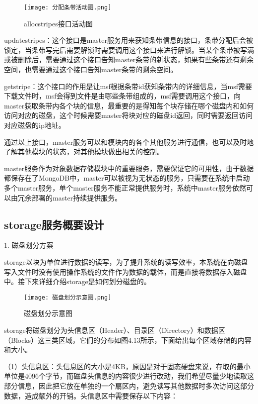 \begin{figure}
  \centering
  \texttt{[image: 分配条带活动图.png]}
  \caption{allocstripes接口活动图}
\end{figure}

updatestripes：这个接口是master服务用来获知条带信息的接口，条带分配后会被锁定，当条带写完后需要解锁时需要调用这个接口来进行解锁。当某个条带被写满或被删除后，需要通过这个接口告知master条带的新状态，如果有些条带还有剩余空间，也需要通过这个接口告知master条带的剩余空间。

getstripe：这个接口的作用是让msf根据条带id获知条带内的详细信息，当msf需要下载文件时，msf会得到文件是由哪些条带组成的，msf需要调用这个接口，向master获取条带内各个块的信息，最重要的是得知每个块存储在哪个磁盘内和如何访问对应的磁盘，这个时候需要master将块对应的磁盘id返回，同时需要返回访问对应磁盘的ip地址。

通过以上接口，master服务可以和模块内的各个其他服务进行通信，也可以及时地了解其他模块的状态，对其他模块做出相关的控制。

master服务作为对象数据存储模块中的重要服务，需要保证它的可用性，由于数据都保存在了MongoDB中，master可以被视为无状态的服务，只需要在系统中启动多个master服务，单个master服务不能正常提供服务时，系统中master服务依然可以由冗余部署的master持续提供服务。

\subsection{storage服务概要设计}

1. 磁盘划分方案

storage以块为单位进行数据的读写，为了提升系统的读写效率，本系统在向磁盘写入文件时没有使用操作系统的文件作为数据的载体，而是直接将数据存入磁盘中。接下来详细介绍storage是如何划分磁盘的。

\begin{figure}
  \centering
  \texttt{[image: 磁盘划分示意图.png]}
  \caption{磁盘划分示意图}
\end{figure}

storage将磁盘划分为头信息区（Header）、目录区（Directory）和数据区（Blocks）这三类区域，它们的分布如图4.13所示，下面给出每个区域存储的内容和大小。

（1）头信息区：头信息区的大小是4KB，原因是对于固态硬盘来说，存取的最小单位是4096个字节，而磁盘头信息的内容很少进行改动，我们希望尽量少地读取这部分信息，因此把它放在单独的一个扇区内，避免读写其他数据时多次访问这部分数据，造成额外的开销。头信息区中需要保存以下内容：

